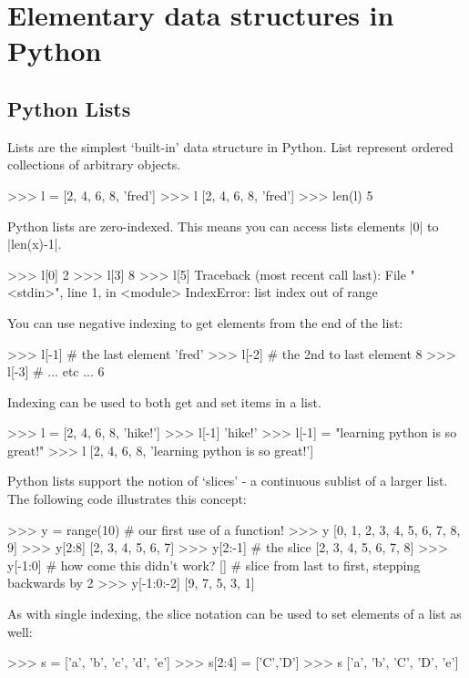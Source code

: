 

\section{Elementary data structures in Python}

\subsection{Python Lists}

Lists are the simplest `built-in' data structure in Python. List
represent ordered collections of arbitrary objects.
%
\begin{python}
>>> l = [2, 4, 6, 8, 'fred']
>>> l
[2, 4, 6, 8, 'fred']
>>> len(l)
5
\end{python}

Python lists are zero-indexed. This means you can access lists elements
|0| to |len(x)-1|.
%
\begin{python}
>>> l[0]
2
>>> l[3]
8
>>> l[5]
Traceback (most recent call last):
  File "<stdin>", line 1, in <module>
IndexError: list index out of range
\end{python}
%
You can use negative indexing to get elements from the end of the list:
\begin{python}
>>> l[-1] # the last element
'fred'
>>> l[-2] # the 2nd to last element
8
>>> l[-3] # ... etc ...
6
\end{python}

Indexing can be used to both get and set items in a list.
\begin{python}
>>> l = [2, 4, 6, 8, 'hike!']
>>> l[-1]
'hike!'
>>> l[-1] = "learning python is so great!"
>>> l
[2, 4, 6, 8, 'learning python is so great!']
\end{python}

Python lists support the notion of `slices' - a continuous sublist of a
larger list. The following code illustrates this concept:
%
\begin{python}
>>> y = range(10)  # our first use of a function!
>>> y
[0, 1, 2, 3, 4, 5, 6, 7, 8, 9]
>>> y[2:8]
[2, 3, 4, 5, 6, 7]
>>> y[2:-1] # the slice
[2, 3, 4, 5, 6, 7, 8]
>>> y[-1:0] # how come this didn't work? 
[]
# slice from last to first, stepping backwards by 2
>>> y[-1:0:-2]  
[9, 7, 5, 3, 1]
\end{python}
%
As with single indexing, the slice notation can be used to set elements of a list as well:
\begin{python}
>>> s = ['a', 'b', 'c', 'd', 'e']
>>> s[2:4] = ['C','D']
>>> s
['a', 'b', 'C', 'D', 'e']
\end{python}


